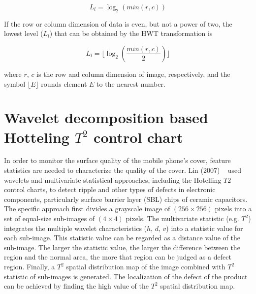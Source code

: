 \begin{equation}
L_l= \log_2(min(r,c)) \label{equa:log1}
\end{equation}

If the row or column dimension of data is even, but not a power of two, the lowest level ($L_l$) that can be obtained by the HWT transformation is

\begin{equation}
L_l = \lfloor \log_2\left(\frac{min(r,c)}{2}\right) \rfloor 
\label{equa:log2}
\end{equation}

where $r$, $c$ is the row and column dimension of image, respectively, and the symbol $\lfloor E \rfloor$ rounds element $E$ to the nearest number.








\section{Wavelet decomposition based Hotteling $T^{2}$ control chart}
In order to monitor the surface quality of the mobile phone's cover, feature statistics are needed to characterize the quality of the cover.
Lin (2007) ~\nocite{lin2007automated} used wavelets and multivariate statistical approaches, including the Hotelling $T2$ control charts, to detect ripple and other types of defects in electronic components, particularly surface barrier layer (SBL) chips of ceramic capacitors. 
The specific approach first divides a grayscale image of $(256 \times 256)$ pixels into a set of equal-size sub-images of $(4 \times 4)$ pixels. The multivariate statistic (e.g. $T^{2}$) integrates the multiple wavelet characteristics ($h$, $d$, $v$) into a statistic value for each sub-image. This statistic value can be regarded as a distance value of the sub-image. The larger the statistic value, the larger the difference between the region and the normal area, the more that region can be judged as a defect region. Finally, a $T^{2}$ spatial distribution map of the image combined with $T^{2}$ statistic of sub-images is generated. The localization of the defect of the product can be achieved by finding the high value of the $T^{2}$ spatial distribution map. 


